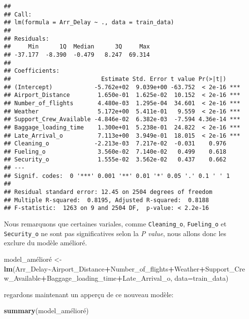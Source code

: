 \documentclass[
]{article}
\newenvironment{Shaded}{\begin{snugshade}}{\end{snugshade}}
\newcommand{\AttributeTok}[1]{\textcolor[rgb]{0.13,0.29,0.53}{#1}}
\newcommand{\FunctionTok}[1]{\textcolor[rgb]{0.13,0.29,0.53}{\textbf{#1}}}
\newcommand{\NormalTok}[1]{#1}
\newcommand{\OtherTok}[1]{\textcolor[rgb]{0.56,0.35,0.01}{#1}}
\newcommand{\SpecialCharTok}[1]{\textcolor[rgb]{0.81,0.36,0.00}{\textbf{#1}}}
\begin{document}
\begin{verbatim}
## 
## Call:
## lm(formula = Arr_Delay ~ ., data = train_data)
## 
## Residuals:
##     Min      1Q  Median      3Q     Max 
## -37.177  -8.390  -0.479   8.247  69.314 
## 
## Coefficients:
##                          Estimate Std. Error t value Pr(>|t|)    
## (Intercept)            -5.762e+02  9.039e+00 -63.752  < 2e-16 ***
## Airport_Distance        1.650e-01  1.625e-02  10.152  < 2e-16 ***
## Number_of_flights       4.480e-03  1.295e-04  34.601  < 2e-16 ***
## Weather                 5.172e+00  5.411e-01   9.559  < 2e-16 ***
## Support_Crew_Available -4.846e-02  6.382e-03  -7.594 4.36e-14 ***
## Baggage_loading_time    1.300e+01  5.238e-01  24.822  < 2e-16 ***
## Late_Arrival_o          7.113e+00  3.949e-01  18.015  < 2e-16 ***
## Cleaning_o             -2.213e-03  7.217e-02  -0.031    0.976    
## Fueling_o               3.560e-02  7.140e-02   0.499    0.618    
## Security_o              1.555e-02  3.562e-02   0.437    0.662    
## ---
## Signif. codes:  0 '***' 0.001 '**' 0.01 '*' 0.05 '.' 0.1 ' ' 1
## 
## Residual standard error: 12.45 on 2504 degrees of freedom
## Multiple R-squared:  0.8195, Adjusted R-squared:  0.8188 
## F-statistic:  1263 on 9 and 2504 DF,  p-value: < 2.2e-16
\end{verbatim}

Nous remarquons que certaines variales, comme \texttt{Cleaning\_o},
\texttt{Fueling\_o} et \texttt{Security\_o} ne sont pas significatives
selon la \emph{P value}, nous allons donc les exclure du modèle
amélioré.

\begin{Shaded}
\begin{Highlighting}[]
\NormalTok{model\_amélioré }\OtherTok{\textless{}{-}} \FunctionTok{lm}\NormalTok{(Arr\_Delay}\SpecialCharTok{\textasciitilde{}}\NormalTok{Airport\_Distance}\SpecialCharTok{+}\NormalTok{Number\_of\_flights}\SpecialCharTok{+}\NormalTok{Weather}\SpecialCharTok{+}\NormalTok{Support\_Crew\_Available}\SpecialCharTok{+}\NormalTok{Baggage\_loading\_time}\SpecialCharTok{+}\NormalTok{Late\_Arrival\_o, }\AttributeTok{data=}\NormalTok{train\_data)}
\end{Highlighting}
\end{Shaded}

regardons maintenant un apperçu de ce nouveau modèle:

\begin{Shaded}
\begin{Highlighting}[]
\FunctionTok{summary}\NormalTok{(model\_amélioré)}
\end{Highlighting}
\end{Shaded}
\end{document}
